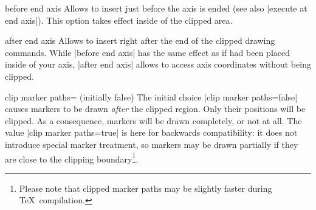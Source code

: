 \begin{pgfplotscodekey}{before end axis}
Allows to insert  just before the axis is ended (see also |execute at end axis|). This option takes effect inside of the clipped area.
\begin{codeexample}[]
\end{codeexample}
\end{pgfplotscodekey}

\begin{pgfplotscodekey}{after end axis}
Allows to insert  right after the end of the clipped drawing commands. While |before end axis| has the same effect as if  had been placed inside of your axis, |after end axis| allows to access axis coordinates without being clipped.
\begin{codeexample}[]
\end{codeexample}
\end{pgfplotscodekey}

\begin{pgfplotskey}{clip marker paths= (initially false)}
	The initial choice |clip marker paths=false| causes markers to be drawn \emph{after} the clipped region. Only their positions will be clipped. As a consequence, markers will be drawn completely, or not at all. The value |clip marker paths=true| is here for backwards compatibility: it does not introduce special marker treatment, so markers may be drawn partially if they are close to the clipping boundary\footnote{Please note that clipped marker paths may be slightly faster during \TeX\ compilation.}.
\end{pgfplotskey}

